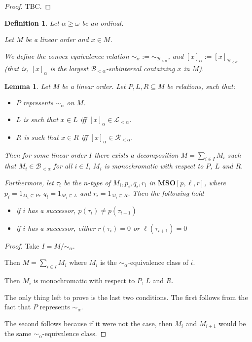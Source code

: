 \documentclass{article}
\newtheorem{lemma}{Lemma}
\newtheorem{definition}{Definition}
\newcommand{\brackets}[1]{\left[ {#1} \right]}
\newcommand{\mso}{\mathbf{MSO}}
\begin{document}
\begin{proof}
  TBC.
\end{proof}

\begin{definition}
  Let $\alpha \ge \omega$ be an ordinal.

  Let $M$ be a linear order and $x \in M$.

  We define the convex equivalence relation $\sim_\alpha := \sim_{\mathcal{B}_{< \alpha}}$,
  and $\brackets{x}_{\alpha} := \brackets{x}_{\mathcal{B}_{< \alpha}}$ (that is,
  $\brackets{x}_{\alpha}$ is the largest $\mathcal{B}_{< \alpha}$-subinterval
  containing $x$ in $M$).
\end{definition}

\begin{lemma}
  Let $M$ be a linear order. Let $P, L, R \subseteq M$ be relations, such that:

  \begin{itemize}
    \item $P$ represents $\sim_{\alpha}$ on $M$.
    \item $L$ is such that $x \in L$ iff $\brackets{x}_{\alpha} \in \mathcal{L}_{< \alpha}$.
    \item $R$ is such that $x \in R$ iff $\brackets{x}_{\alpha} \in \mathcal{R}_{< \alpha}$.
  \end{itemize}

  Then for some linear order $I$ there exists a decomposition
  $M = \sum_{i \in I} M_i$ such that $M_i \in \mathcal{B}_{< \alpha}$ for all $i \in I$,
  $M_i$ is monochromatic with respect to $P$, $L$ and $R$.

  Furthermore, let $\tau_i$ be the $n$-type of $M_i, p_i, q_i, r_i$ in $\mso[p, \ell, r]$,
  where $p_i = 1_{M_i \subseteq P}$, $q_i = 1_{M_i \subseteq L}$ and $r_i = 1_{M_i \subseteq R}$.
  Then the following hold
  \begin{itemize}
    \item if $i$ has a successor, $p(\tau_i) \ne p(\tau_{i+1})$
    \item if $i$ has a successor, either $r(\tau_i) = 0$ or $\ell(\tau_{i+1}) = 0$
  \end{itemize}
\end{lemma}
\begin{proof}
  Take $I = M / \sim_{\alpha}$.

  Then $M = \sum_{i \in I} M_i$ where $M_i$ is the $\sim_{\alpha}$-equivalence class of $i$.

  Then $M_i$ is monochromatic with respect to $P$, $L$ and $R$.

  The only thing left to prove is the last two conditions. The first follows from
  the fact that $P$ represents $\sim_{\alpha}$.

  The second follows because if it were not the case, then $M_i$ and $M_{i+1}$ would
  be the same $\sim_{\alpha}$-equivalence class.
\end{proof}
\end{document}
